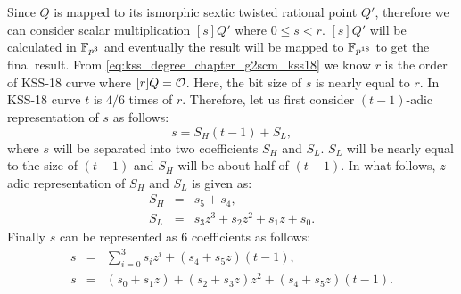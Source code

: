 Since $Q$ is mapped to its ismorphic sextic twisted rational point $Q'$, therefore we can consider scalar multiplication $[s]Q'$ where $0 \leq s < r$. $[s]Q'$ will be calculated in $\mathbb{F}_{p^3}$ and eventually the result will be mapped to $\mathbb{F}_{p^{18}}$ to get the final result. From \eqref{eq:kss_degree_chapter_g2scm_kss18} we know $r$ is the order of KSS-18 curve  where $[r]Q=\cal O$. Here, the bit size of $s$ is nearly equal to $r$. In KSS-18 curve $t$ is  $4/6$ times of  $r$. Therefore, let us first consider $(t-1)$-adic representation of $s$ as follows:
\begin{equation}\label{eq:t-1_adic_chapter_g2scm_kss18}
s =  S_H(t-1)+S_L,
\end{equation}
where $s$ will be separated into two coefficients $S_H$ and $S_L$. $S_L$ will be nearly equal to the size of $(t-1)$ and $S_H$ will be about half of $(t-1)$. 
In what follows, $z$-adic representation of $S_H$ and $S_L$ is given as:
\begin{eqnarray}\label{eq:eqn_scalar_mul_chapter_g2scm_kss18_Q}
S_H & =  & s_5+ s_4,\nonumber \\
S_L & = & s_3 z^3+s_2 z^2+s_1 z+s_0.\nonumber 
\end{eqnarray}
Finally $s$ can be represented as 6 coefficients as follows:
\begin{eqnarray}\label{eq:sclar_final_rep_chapter_g2scm_kss18}
s & =  & \sum_{i=0}^{3} s_iz^i + (s_4+s_5z)(t-1),\nonumber \\
s & = & (s_0+s_1z) + (s_2 +s_3z)z^2 +(s_4+s_5z)(t-1).
\end{eqnarray}

